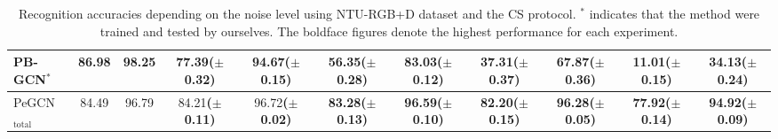 \documentclass[runningheads]{llncs}
\begin{document}
\begin{table*}[t]
{\begin{tabular}{l c c c c c c c c c c}
        \multicolumn{1}{l}{PB-GCN$^{*}$ \cite{thakkar2018part}} &86.98	&\textbf{98.25}& 77.39($\pm$0.32)&	94.67($\pm$0.15)&	56.35($\pm$0.28)&	83.03($\pm$0.12)&	37.31($\pm$0.37)&	67.87($\pm$0.36)&	11.01($\pm$0.15)&	34.13($\pm$0.24)\\
		
	    \hline
		\multicolumn{1}{l}{PeGCN$_{\text{total}}$} &  84.49 &	96.79 &
		84.21\textbf{($\pm$0.11)}&	96.72\textbf{($\pm$0.02)}&	\textbf{83.28($\pm$0.13)}&	\textbf{96.59($\pm$0.10)}&	\textbf{82.20($\pm$0.15)}&	\textbf{96.28($\pm$0.05)}&	\textbf{77.92($\pm$0.14)}&	\textbf{94.92($\pm$0.09)} \\
		\midrule
		\bottomrule
	\end{tabular}
}
	\caption{Recognition accuracies depending on the noise level using NTU-RGB+D dataset and the CS protocol. $^{*}$ indicates that the method were trained and tested by ourselves. The boldface figures denote the highest performance for each experiment.}
	\label{tab:ntu_cs}
	\vspace{-4ex}
\end{table*}
\end{document}
